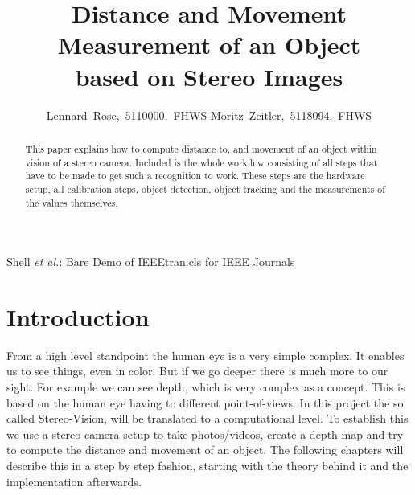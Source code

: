 \documentclass[journal,onecolumn]{IEEEtran}
\begin{document}
	\title{Distance and Movement Measurement of an Object\\ based on Stereo Images}

	\author{Lennard~Rose,~5110000,~FHWS
		Moritz~Zeitler,~5118094,~FHWS%
	}
	{Shell \MakeLowercase{\textit{et al.}}: Bare Demo of IEEEtran.cls for IEEE Journals}

	\maketitle

	\begin{abstract}
		\noindent
		This paper explains how to compute distance to, and movement of an object within vision of a stereo camera.
		Included is the whole workflow consisting of all steps that have to be made to get such a recognition to work. These steps are the hardware setup, all calibration steps, object detection, object tracking and the measurements of the values themselves.
	\end{abstract}


	\IEEEpeerreviewmaketitle

	\section{Introduction}
\label{sec:einfuehrung}
\noindent
From a high level standpoint the human eye is a very simple complex. It enables us to see things, even in color. But if we go deeper there is much more to our sight. For example we can see depth, which is very complex as a concept. This is based on the human eye having to different point-of-views. In this project the so called Stereo-Vision, will be translated to a computational level. To establish this we use a stereo camera setup to take photos/videos, create a depth map and try to compute the distance and movement of an object. The following chapters will describe this in a step by step fashion, starting with the theory behind it and the implementation afterwards.
\end{document}
